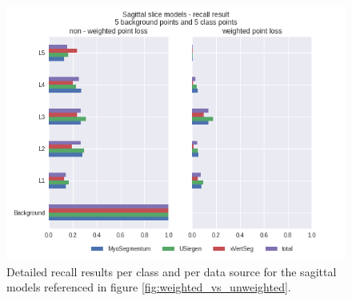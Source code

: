 \begin{figure}
    \centering
    \includegraphics[width=.95\textwidth]{images/perClass_weighted_nonweighted.png}
    \caption{
        Detailed recall results per class and per data source for the sagittal models referenced in figure \ref{fig:weighted_vs_unweighted}.
        \label{fig:recall_weighted_vs_unweighted}}
\end{figure}


